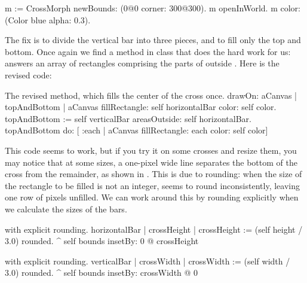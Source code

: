 \documentclass[a4paper,10pt,twoside]{book}
\begin{document}

\begin{code}{}
m := CrossMorph newBounds: (0@0 corner: 300@300).
m openInWorld.
m color: (Color blue alpha: 0.3).

\end{code}

\noindent
The fix is to divide the vertical bar into three pieces, and to fill only the top and bottom.  
Once again we find a method in class  that does the hard work for us:  answers an array of rectangles comprising the parts of  outside .
Here is the revised code:

\begin{method}{The revised  method, which fills the center of the cross once.}
drawOn: aCanvas 
	| topAndBottom |
	aCanvas fillRectangle: self horizontalBar color: self color.
	topAndBottom := self verticalBar areasOutside: self horizontalBar. 
	topAndBottom do: [ :each | aCanvas fillRectangle: each color: self color]
\end{method}

This code seems to work, but if you try it on some crosses and resize them, you may notice that at some sizes, a one-pixel wide line separates the bottom of the cross from the remainder, as shown in .
This is due to rounding: when the size of the rectangle to be filled is not an integer, 
seems to round inconsistently, leaving one row of pixels unfilled.
We can work around this by rounding explicitly when we calculate the sizes of the bars.

\begin{method}{ with explicit rounding.}
horizontalBar
	| crossHeight |
	crossHeight := (self height / 3.0) rounded.
	^ self bounds insetBy: 0 @ crossHeight
\end{method}

\begin{method}{ with explicit rounding.}
verticalBar
	| crossWidth |
	crossWidth := (self width / 3.0) rounded.
	^ self bounds insetBy: crossWidth @ 0
\end{method}



\end{document}

